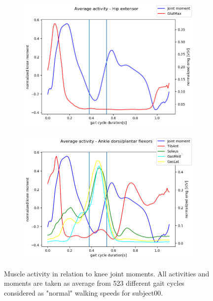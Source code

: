 \documentclass[../main.tex]{subfiles}
\begin{document}
\begin{figure}
\begin{subfigure}[b]{0.45\textwidth}
     \end{subfigure}
     \hfill
     \begin{subfigure}[b]{0.45\textwidth}
         \centering
         \includegraphics[width=\textwidth]{img/results/norm_emg_hip_ext_hline.png}
     \end{subfigure}
     \hfill
     \begin{subfigure}[b]{0.45\textwidth}
         \centering
         \includegraphics[width=\textwidth]{img/results/norm_emg_ankle_flex_hline.png}
     \end{subfigure}
    \caption{Muscle activity in relation to knee joint moments. All activities and moments are taken as average from 523 different gait cycles considered as "normal" walking speeds for subject00.}
    \label{fig:emg-to-moment-representation}
\end{figure}
\end{document}
